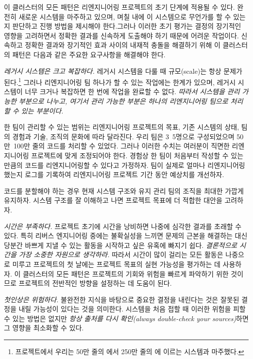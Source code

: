 \documentclass[a4paper,10pt,twoside]{book}
\begin{document}
이 클러스터의 모든 패턴은 리엔지니어링 프로젝트의 초기 단계에 적용될 수 있다. 완전히 새로운 시스템을 마주하고 있으며, 며칠 내에 이 시스템으로 무언가를 할 수 있는지 판단하고 진행 방법을 제시해야 한다.그러나 이러한 초기 평가는 결정의 장기적인 영향을 고려하면서 정확한 결과를 신속하게 도출해야 하기 때문에 어려운 작업이다. 신속하고 정확한 결과와 장기적인 효과 사이의 내재적 충돌을 해결하기 위해 이 클러스터의 패턴은 다음과 같은 주요한 요구사항을 해결해야 한다.

\begin{bulletlist}
  \item \emph{레거시 시스템은 크고 복잡하다.}
레거시 시스템을 다룰 때 규모(scale)는 항상 문제가 된다.\footnote{ 프로젝트에서 우리는 50만 줄의 에서 250만 줄의 에 이르는 시스템과 마주했다.}
그러나 리엔지니어링 팀 하나가 할 수 있는 작업에는 한계가 있으며, 레거시 시스템이 너무 크거나 복잡하면 한 번에 작업을 완료할 수 없다.
\emph{따라서 시스템을 관리 가능한 부분으로 나누고, 여기서 관리 가능한 부분은 하나의 리엔지니어링 팀으로 처리할 수 있는 부분이다.}

한 팀이 관리할 수 있는 범위는 리엔지니어링 프로젝트의 목표, 기존 시스템의 상태, 팀의 경험과 기술, 조직의 문화에 따라 달라진다. 우리 팀은 3~5명으로 구성되었으며 50만~100만 줄의 코드를 처리할 수 있었다. 그러나 이러한 수치는 여러분이 직면한 리엔지니어링 프로젝트에 맞게 조정되어야 한다. 경험상 한 팀이 처음부터 작성할 수 있는 만큼의 코드를 리엔지니어링할 수 있다고 가정하자. 팀이 실제로 얼마나 리엔지니어링했는지 로그를 기록하여 리엔지니어링 프로젝트 기간 동안 예상치를 개선하자.

코드를 분할해야 하는 경우 현재 시스템 구조와 유지 관리 팀의 조직을 최대한 가깝게 유지하자. 시스템 구조를 잘 이해하고 나면 프로젝트 목표에 더 적합한 대안을 고려하자.

  \item \emph{시간은 부족하다.}
프로젝트 초기에 시간을 낭비하면 나중에 심각한 결과를 초래할 수 있다. 특히 리버스 엔지니어링 중에는 불확실성을 느끼면 문제의 근본을 해결하는 대신 당분간 바쁘게 지낼 수 있는 활동을 시작하고 싶은 유혹에 빠지기 쉽다. \emph{결론적으로 시간을 가장 소중한 자원으로 생각하라.} 따라서 시간이 많이 걸리는 모든 활동은 나중으로 미루고 프로젝트의 첫 날에는 프로젝트 목표의 실현 가능성을 평가하는 데 사용하자. 이 클러스터의 모든 패턴은 프로젝트의 기회와 위험을 빠르게 파악하기 위한 것이므로 프로젝트의 전반적인 방향을 설정하는 데 도움이 된다.

  \item \emph{첫인상은 위험하다.}
불완전한 지식을 바탕으로 중요한 결정을 내린다는 것은 잘못된 결정을 내릴 가능성이 있다는 것을 의미한다. 시스템을 처음 접할 때 이러한 위험을 피할 수 있는 방법은 없지만 \emph{항상 출처를 다시 확인(always double-check your sources)}하면 그 영향을 최소화할 수 있다.


\end{bulletlist}
\end{document}
